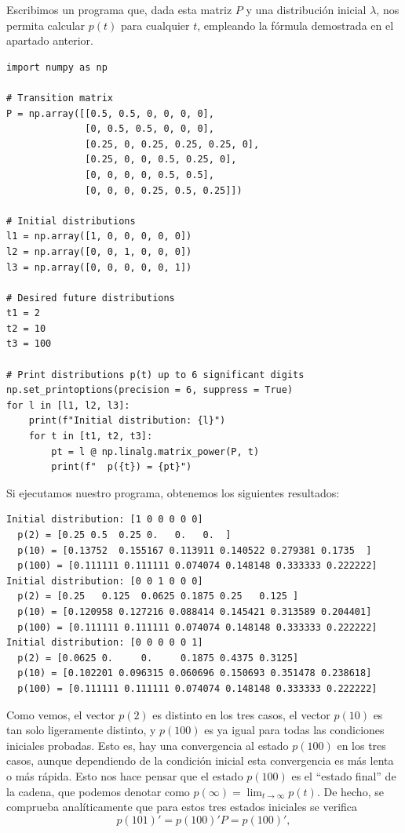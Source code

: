 \documentclass[11pt,a4paper]{article}
\begin{document}
Escribimos un programa que, dada esta matriz $P$ y una distribución inicial $\lambda$, nos permita calcular $p(t)$ para cualquier $t$, empleando la fórmula demostrada en el apartado anterior.

\begin{verbatim}
import numpy as np

# Transition matrix
P = np.array([[0.5, 0.5, 0, 0, 0, 0],
              [0, 0.5, 0.5, 0, 0, 0],
              [0.25, 0, 0.25, 0.25, 0.25, 0],
              [0.25, 0, 0, 0.5, 0.25, 0],
              [0, 0, 0, 0, 0.5, 0.5],
              [0, 0, 0, 0.25, 0.5, 0.25]])

# Initial distributions
l1 = np.array([1, 0, 0, 0, 0, 0])
l2 = np.array([0, 0, 1, 0, 0, 0])
l3 = np.array([0, 0, 0, 0, 0, 1])

# Desired future distributions
t1 = 2
t2 = 10
t3 = 100

# Print distributions p(t) up to 6 significant digits
np.set_printoptions(precision = 6, suppress = True)
for l in [l1, l2, l3]:
    print(f"Initial distribution: {l}")
    for t in [t1, t2, t3]:
        pt = l @ np.linalg.matrix_power(P, t)
        print(f"  p({t}) = {pt}")

\end{verbatim}

Si ejecutamos nuestro programa, obtenemos los siguientes resultados:

\begin{verbatim}
Initial distribution: [1 0 0 0 0 0]
  p(2) = [0.25 0.5  0.25 0.   0.   0.  ]
  p(10) = [0.13752  0.155167 0.113911 0.140522 0.279381 0.1735  ]
  p(100) = [0.111111 0.111111 0.074074 0.148148 0.333333 0.222222]
Initial distribution: [0 0 1 0 0 0]
  p(2) = [0.25   0.125  0.0625 0.1875 0.25   0.125 ]
  p(10) = [0.120958 0.127216 0.088414 0.145421 0.313589 0.204401]
  p(100) = [0.111111 0.111111 0.074074 0.148148 0.333333 0.222222]
Initial distribution: [0 0 0 0 0 1]
  p(2) = [0.0625 0.     0.     0.1875 0.4375 0.3125]
  p(10) = [0.102201 0.096315 0.060696 0.150693 0.351478 0.238618]
  p(100) = [0.111111 0.111111 0.074074 0.148148 0.333333 0.222222]
\end{verbatim}

Como vemos, el vector $p(2)$ es distinto en los tres casos, el vector $p(10)$ es tan solo ligeramente distinto, y $p(100)$ es ya igual para todas las condiciones iniciales probadas. Esto es, hay una convergencia al estado $p(100)$ en los tres casos, aunque dependiendo de la condición inicial esta convergencia es más lenta o más rápida. Esto nos hace pensar que el estado $p(100)$ es el ``estado final'' de la cadena, que podemos denotar como $p(\infty) = \lim_{t\to\infty} p(t)$. De hecho, se comprueba analíticamente que para estos tres estados iniciales se verifica
\[
p(101)'=p(100)'P = p(100)',
\]
\end{document}
